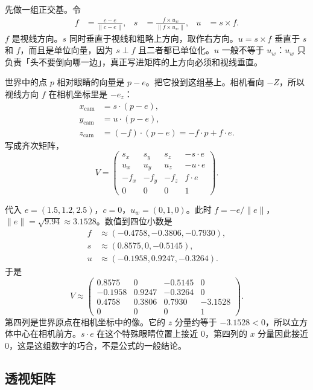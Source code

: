 \documentclass[12pt,a4paper]{article}
\theoremstyle{definition}
\theoremstyle{plain}
\theoremstyle{remark}
\begin{document}
先做一组正交基。令
\begin{align*}
f&=\frac{c-e}{\lVert c-e\rVert},&
s&=\frac{f\times u_w}{\lVert f\times u_w\rVert},&
u&=s\times f.
\end{align*}
$f$ 是视线方向。$s$ 同时垂直于视线和粗略上方向，取作右方向。$u=s\times f$ 垂直于 $s$ 和 $f$，而且是单位向量，因为 $s\perp f$ 且二者都已单位化。$u$ 一般不等于 $u_w$：$u_w$ 只负责「头不要倒向哪一边」，真正写进矩阵的上方向必须和视线垂直。

世界中的点 $p$ 相对眼睛的向量是 $p-e$。把它投到这组基上。相机看向 $-Z$，所以视线方向 $f$ 在相机坐标里是 $-e_z$：
\begin{align*}
x_{\mathrm{cam}}&=s\cdot(p-e),\\
y_{\mathrm{cam}}&=u\cdot(p-e),\\
z_{\mathrm{cam}}&=(-f)\cdot(p-e)=-f\cdot p+f\cdot e.
\end{align*}
写成齐次矩阵，
\begin{equation}
V=
\begin{pmatrix}
s_x&s_y&s_z&-s\cdot e\\
u_x&u_y&u_z&-u\cdot e\\
-f_x&-f_y&-f_z&f\cdot e\\
0&0&0&1
\end{pmatrix}.
\label{eq:view}
\end{equation}

代入 $e=(1.5,1.2,2.5)$，$c=0$，$u_w=(0,1,0)$。此时 $f=-e/\lVert e\rVert$，$\lVert e\rVert=\sqrt{9.94}\approx 3.1528$。数值到四位小数是
\begin{align*}
f&\approx(-0.4758,-0.3806,-0.7930),\\
s&\approx(0.8575,0,-0.5145),\\
u&\approx(-0.1958,0.9247,-0.3264).
\end{align*}
于是
\begin{equation}
V\approx
\begin{pmatrix}
0.8575&0&-0.5145&0\\
-0.1958&0.9247&-0.3264&0\\
0.4758&0.3806&0.7930&-3.1528\\
0&0&0&1
\end{pmatrix}.
\label{eq:view-num}
\end{equation}
第四列是世界原点在相机坐标中的像。它的 $z$ 分量约等于 $-3.1528<0$，所以立方体中心在相机前方。$s\cdot e$ 在这个特殊眼睛位置上接近 $0$，第四列的 $x$ 分量因此接近 $0$，这是这组数字的巧合，不是公式的一般结论。

\subsection{透视矩阵}
\end{document}
